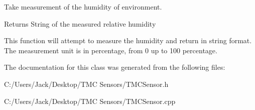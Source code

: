 Take measurement of the humidity of environment. 

\begin{DoxyReturn}{Returns}
String of the measured relative humidity
\end{DoxyReturn}
This function will attempt to measure the humidity and return in string format. The measurement unit is in percentage, from 0 up to 100 percentage. 

The documentation for this class was generated from the following files\+:\begin{DoxyCompactItemize}
\item 
C\+:/\+Users/\+Jack/\+Desktop/\+T\+M\+C Sensors/T\+M\+C\+Sensor.\+h\item 
C\+:/\+Users/\+Jack/\+Desktop/\+T\+M\+C Sensors/T\+M\+C\+Sensor.\+cpp\end{DoxyCompactItemize}
